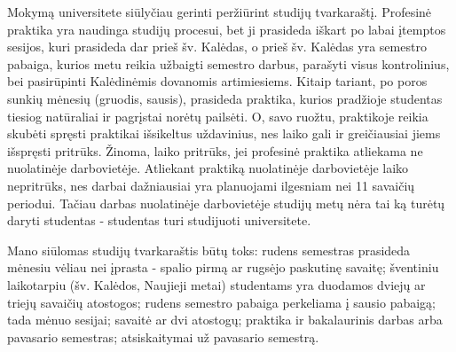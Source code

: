 Mokymą universitete siūlyčiau gerinti peržiūrint studijų tvarkaraštį. Profesinė praktika yra naudinga studijų procesui, bet ji prasideda iškart po labai įtemptos sesijos, kuri prasideda dar prieš šv. Kalėdas, o prieš šv. Kalėdas yra semestro pabaiga, kurios metu reikia užbaigti semestro darbus, parašyti visus kontrolinius, bei pasirūpinti Kalėdinėmis dovanomis artimiesiems. Kitaip tariant, po poros sunkių mėnesių (gruodis, sausis), prasideda praktika, kurios pradžioje studentas tiesiog natūraliai ir pagrįstai norėtų pailsėti. O, savo ruožtu, praktikoje reikia skubėti spręsti praktikai išsikeltus uždavinius, nes laiko gali ir greičiausiai jiems išspręsti pritrūks. Žinoma, laiko pritrūks, jei profesinė praktika atliekama ne nuolatinėje darbovietėje. Atliekant praktiką nuolatinėje darbovietėje laiko nepritrūks, nes darbai dažniausiai yra planuojami ilgesniam nei 11 savaičių periodui. Tačiau darbas nuolatinėje darbovietėje studijų metų nėra tai ką turėtų daryti studentas - studentas turi studijuoti universitete.

Mano siūlomas studijų tvarkaraštis būtų toks: rudens semestras prasideda mėnesiu vėliau nei įprasta - spalio pirmą ar rugsėjo paskutinę savaitę; šventiniu laikotarpiu (šv. Kalėdos, Naujieji metai) studentams yra duodamos dviejų ar triejų savaičių atostogos; rudens semestro pabaiga perkeliama į sausio pabaigą; tada mėnuo sesijai; savaitė ar dvi atostogų; praktika ir bakalaurinis darbas arba pavasario semestras; atsiskaitymai už pavasario semestrą.